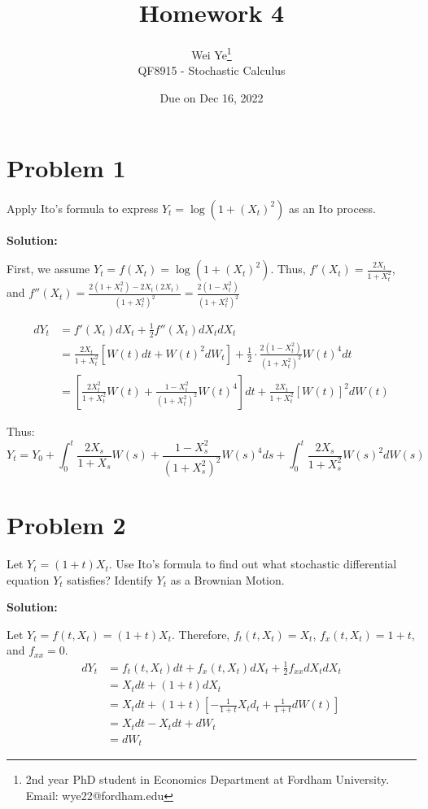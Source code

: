 \documentclass[11pt]{article} %
\title{Homework 4}
\author{Wei Ye\footnote{2nd year PhD student in Economics Department at Fordham University. Email: wye22@fordham.edu}
    \\ QF8915 - Stochastic Calculus}
\date{Due on Dec 16, 2022}
\begin{document}
\maketitle

\section*{Problem 1}
Apply Ito's formula to express $Y_t = \log(1+(X_t)^2)$ as an Ito process.

\textbf{Solution:}

First, we assume $Y_t = f(X_t) = \log(1+(X_t)^2)$. Thus, $f'(X_t) = \frac{2X_t}{1+X_t^2}$, and $f''(X_t) = \frac{2(1+X_t^2)-2X_t(2X_t)}{(1+X_t^2)^2} = \frac{2(1-X_t^2)}{(1+X_t^2)^2}$


\begin{align*}
    dY_t &= f'(X_t)dX_t + \frac{1}{2}f''(X_t)dX_tdX_t\\
         &= \frac{2X_t}{1+X_t^2}[W(t)dt +W(t)^2dW_t] +\frac{1}{2}\cdot\frac{2(1-X_t^2)}{(1+X_t^2)^2}W(t)^4dt\\
         &= [\frac{2X_t^2}{1+X_t^2}W(t)+\frac{1-X_t^2}{(1+X_t^2)^2}W(t)^4]dt+ \frac{2X_t}{1+X_t^2}[W(t)]^2dW(t)
\end{align*}

Thus:
\begin{equation*}
    Y_t = Y_0+ \int_0^t \frac{2X_s}{1+X_s}W(s)+ \frac{1-X_s^2}{(1+X_s^2)^2}W(s)^4ds + \int_0^t \frac{2X_s}{1+X_s^2}W(s)^2 dW(s)
\end{equation*}

\section*{Problem 2}
Let $Y_t = (1+t)X_t$. Use Ito's formula to find out what stochastic differential equation $Y_t$ satisfies? Identify $Y_t$ as a Brownian Motion.

\textbf{Solution:}

Let $Y_t = f(t,X_t) = (1+t)X_t$. Therefore, $f_t(t,X_t) = X_t$, $f_x(t,X_t) = 1+t$, and $f_{xx} = 0$. 
\begin{align*}
    dY_t &= f_t(t,X_t)dt + f_x(t,X_t)dX_t + \frac{1}{2}f_{xx}dX_t dX_t\\
        &= X_t dt + (1+t)dX_t\\
        &= X_t dt + (1+t)[-\frac{1}{1+t}X_td_t + \frac{1}{1+t}dW(t)]\\
        &= X_t dt- X_tdt +dW_t\\
        &= dW_t
\end{align*}
\end{document}
